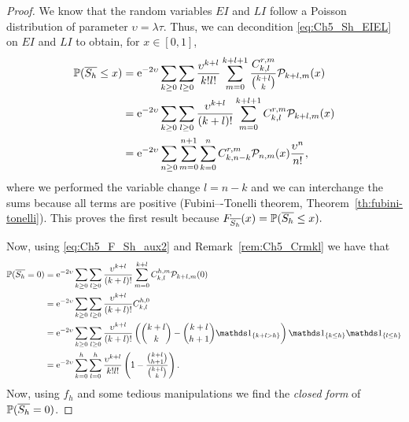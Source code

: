 \begin{proof}
    We know that the random variables $EI$ and $LI$ follow a Poisson distribution of parameter $\upsilon=\lambda\tau$. Thus, we can decondition \eqref{eq:Ch5_Sh_EIEL} on $EI$ and $LI$ to obtain, for $x\in[0,1]$,
    \begin{align}
    	\P(\overline{S_h} \leq x)
    	    &= \euler^{-2\upsilon}\sum_{k \geq 0}\sum_{l \geq 0} \frac{\upsilon^{k+l}}{k!l!}\sum_{m=0}^{k+l+1} \dfrac{C_{k,l}^{r,m}}{\binom{k+l}{k}} \cal{P}_{k+l,m}(x) \label{eq:Ch5_F_Sh_aux1}\\
    		&= \euler^{-2\upsilon}\sum_{k \geq 0}\sum_{l \geq 0} \frac{\upsilon^{k+l}}{(k+l)!}\sum_{m=0}^{k+l+1} C_{k,l}^{r,m} \cal{P}_{k+l,m}(x) \label{eq:Ch5_F_Sh_aux2}\\
        	&= \euler^{-2\upsilon}\sum_{n \geq 0} \sum_{m=0}^{n+1}  \sum_{k=0}^n C^{r,m}_{k,n-k} \cal{P}_{n,m}(x)  \frac{\upsilon^n}{n!},
    \end{align}
    where we performed the variable change $l=n-k$ and we can interchange the sums because all terms are positive (Fubini–-Tonelli theorem, Theorem~\ref{th:fubini-tonelli}).
    This proves the first result because $F_{\overline{S_h}}(x) = \P(\overline{S_h} \le x).$
    
    Now, using \eqref{eq:Ch5_F_Sh_aux2} and Remark~\ref{rem:Ch5_Crmkl} we have that
    \begin{align*}
    \P(\overline{S_h} = 0)
    	 &= \euler^{-2\upsilon}\sum_{k \geq 0}\sum_{l \geq 0} \frac{\upsilon^{k+l}}{(k+l)!}\sum_{m=0}^{k+l} C_{k,l}^{h,m} \cal{P}_{k+l,m}(0)\\
         &= \euler^{-2\upsilon}\sum_{k \geq 0}\sum_{l \geq 0} \frac{\upsilon^{k+l}}{(k+l)!} C_{k,l}^{h,0}\\
         &= \euler^{-2\upsilon}\sum_{k \geq 0}\sum_{l \geq 0} \frac{\upsilon^{k+l}}{(k+l)!} \left( \binom{k+l}{k} - \binom{k+l}{h+1} \ind_{\{k+l > h\}} \right)\ind_{\{k \leq h\}}\ind_{\{l \leq h\}}\\
         &= \euler^{-2\upsilon}\sum_{k = 0}^h \sum_{l = 0}^h \frac{\upsilon^{k+l}}{k!l!} \left( 1 - \frac{\binom{k+l}{h+1}}{\binom{k+l}{k}} \right).
    \end{align*}
    Now, using $f_h$ and some tedious manipulations we find the \textit{closed form} of $\P(\overline{S_h} = 0)$.
    

\end{proof}
